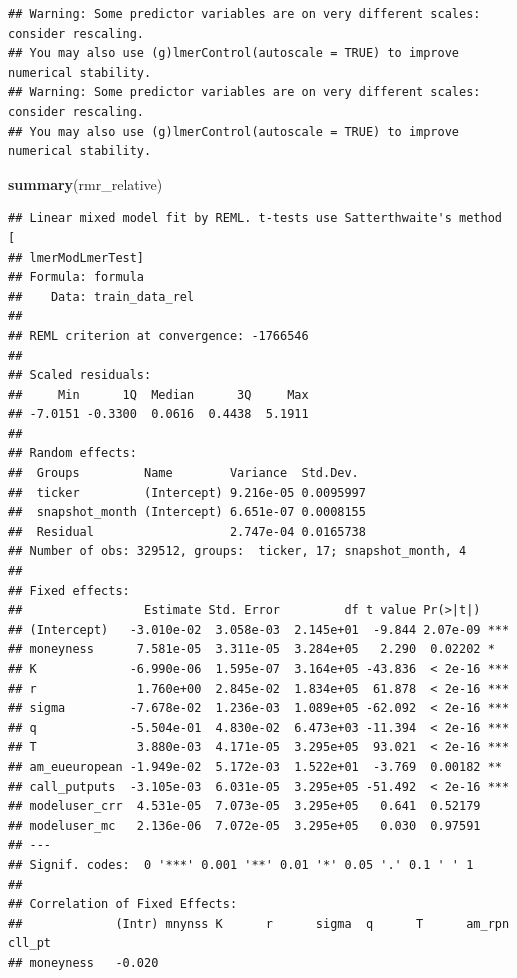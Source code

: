 \documentclass[
]{article}
\newenvironment{Shaded}{\begin{snugshade}}{\end{snugshade}}
\newcommand{\FunctionTok}[1]{\textcolor[rgb]{0.13,0.29,0.53}{\textbf{#1}}}
\newcommand{\NormalTok}[1]{#1}
\begin{document}
\begin{verbatim}
## Warning: Some predictor variables are on very different scales: consider rescaling. 
## You may also use (g)lmerControl(autoscale = TRUE) to improve numerical stability.
## Warning: Some predictor variables are on very different scales: consider rescaling. 
## You may also use (g)lmerControl(autoscale = TRUE) to improve numerical stability.
\end{verbatim}

\begin{Shaded}
\begin{Highlighting}[]
\FunctionTok{summary}\NormalTok{(rmr\_relative)}
\end{Highlighting}
\end{Shaded}

\begin{verbatim}
## Linear mixed model fit by REML. t-tests use Satterthwaite's method [
## lmerModLmerTest]
## Formula: formula
##    Data: train_data_rel
## 
## REML criterion at convergence: -1766546
## 
## Scaled residuals: 
##     Min      1Q  Median      3Q     Max 
## -7.0151 -0.3300  0.0616  0.4438  5.1911 
## 
## Random effects:
##  Groups         Name        Variance  Std.Dev. 
##  ticker         (Intercept) 9.216e-05 0.0095997
##  snapshot_month (Intercept) 6.651e-07 0.0008155
##  Residual                   2.747e-04 0.0165738
## Number of obs: 329512, groups:  ticker, 17; snapshot_month, 4
## 
## Fixed effects:
##                 Estimate Std. Error         df t value Pr(>|t|)    
## (Intercept)   -3.010e-02  3.058e-03  2.145e+01  -9.844 2.07e-09 ***
## moneyness      7.581e-05  3.311e-05  3.284e+05   2.290  0.02202 *  
## K             -6.990e-06  1.595e-07  3.164e+05 -43.836  < 2e-16 ***
## r              1.760e+00  2.845e-02  1.834e+05  61.878  < 2e-16 ***
## sigma         -7.678e-02  1.236e-03  1.089e+05 -62.092  < 2e-16 ***
## q             -5.504e-01  4.830e-02  6.473e+03 -11.394  < 2e-16 ***
## T              3.880e-03  4.171e-05  3.295e+05  93.021  < 2e-16 ***
## am_eueuropean -1.949e-02  5.172e-03  1.522e+01  -3.769  0.00182 ** 
## call_putputs  -3.105e-03  6.031e-05  3.295e+05 -51.492  < 2e-16 ***
## modeluser_crr  4.531e-05  7.073e-05  3.295e+05   0.641  0.52179    
## modeluser_mc   2.136e-06  7.072e-05  3.295e+05   0.030  0.97591    
## ---
## Signif. codes:  0 '***' 0.001 '**' 0.01 '*' 0.05 '.' 0.1 ' ' 1
## 
## Correlation of Fixed Effects:
##             (Intr) mnynss K      r      sigma  q      T      am_rpn cll_pt
## moneyness   -0.020                                                        

\end{verbatim}
\end{document}
